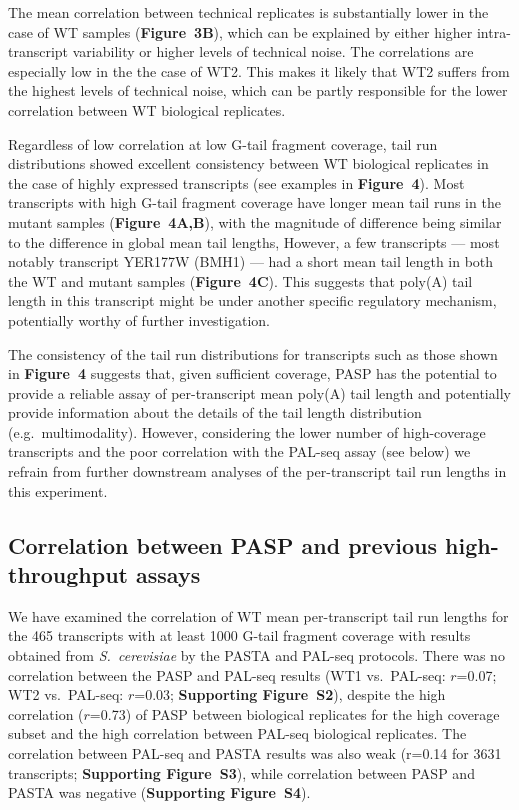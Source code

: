 \documentclass[10pt]{article}
\begin{document}
The mean correlation between technical replicates is substantially lower in the case of WT samples (\textbf{Figure~3B}), which can be explained by either higher intra-transcript variability or higher levels of technical noise. The correlations are especially low in the the case of WT2. This makes it likely that WT2 suffers from the highest levels of technical noise, which can be partly responsible for the lower correlation between WT biological replicates.

Regardless of low correlation at low G-tail fragment coverage, tail run distributions showed excellent consistency between WT biological replicates in the case of highly expressed transcripts (see examples in \textbf{Figure~4}). Most transcripts with high G-tail fragment coverage have longer mean tail runs in the mutant samples (\textbf{Figure~4A,B}), with the magnitude of difference being similar to the difference in global mean tail lengths, However, a few transcripts --- most notably transcript YER177W (BMH1) --- had a short mean tail length in both the WT and mutant samples (\textbf{Figure~4C}). This suggests that poly(A) tail length in this transcript might be under another specific regulatory mechanism, potentially worthy of further investigation.

The consistency of the tail run distributions for transcripts such as those shown in \textbf{Figure~4} suggests that, given sufficient coverage, PASP has the potential to provide a reliable assay of per-transcript mean poly(A) tail length and potentially provide information about the details of the tail length distribution (e.g.~multimodality). However, considering the lower number of high-coverage transcripts and the poor correlation with the PAL-seq assay (see below) we refrain from further downstream analyses of the per-transcript tail run lengths in this experiment.

\subsection*{Correlation between PASP and previous high-throughput assays}

We have examined the correlation of WT mean per-transcript tail run lengths for the 465 transcripts with at least 1000 G-tail fragment coverage with results obtained from \textit{S.~cerevisiae} by the PASTA \cite{beilharz07} and PAL-seq \cite{subtelny14} protocols. There was no correlation between the PASP and PAL-seq results (WT1 vs.\ PAL-seq: $r$=0.07; WT2 vs.\ PAL-seq: $r$=0.03; \textbf{Supporting Figure~S2}), despite the high correlation ($r$=0.73) of PASP between biological replicates for the high coverage subset and the high correlation between PAL-seq biological replicates. The correlation between PAL-seq and PASTA results was also weak (r=0.14 for 3631 transcripts; \textbf{Supporting Figure~S3}), while correlation between PASP and PASTA was negative (\textbf{Supporting Figure~S4}).
\end{document}

